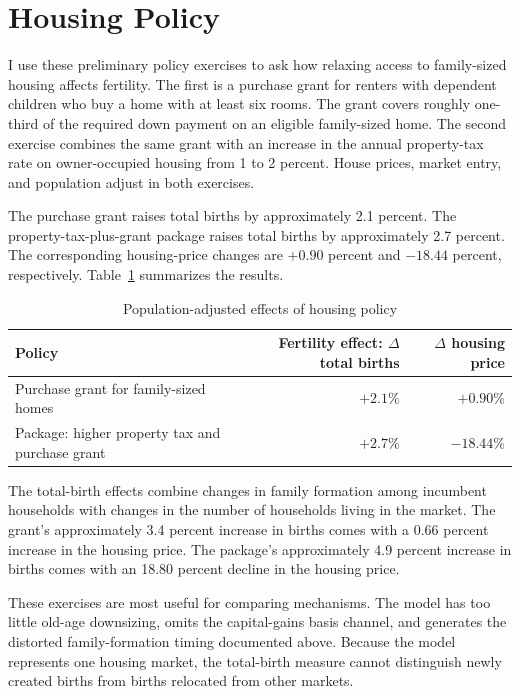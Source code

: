 \documentclass[11pt]{article}
\theoremstyle{definition}
\newcommand{\1}{\mathbf 1}
\begin{document}
\section{Housing Policy}
\label{sec:quant_policy}

I use these preliminary policy exercises to ask how relaxing access to
family-sized housing affects fertility. The first is a purchase grant for
renters with dependent children who buy a home with at least six rooms. The grant
covers roughly one-third of the required down payment on an eligible
family-sized home. The second exercise combines the same grant with an increase
in the annual property-tax rate on owner-occupied housing from 1 to 2 percent.
House prices, market entry, and population adjust in both exercises.

The purchase grant raises total births by approximately 2.1 percent. The
property-tax-plus-grant package raises total births by approximately 2.7
percent. The corresponding housing-price changes are
$+0.90$ percent and $-18.44$ percent, respectively.
Table~\ref{tab:quant_policy} summarizes the results.

\begin{table}[H]
\centering
\caption{Population-adjusted effects of housing policy}
\label{tab:quant_policy}
\small
\begin{tabularx}{0.88\textwidth}{@{}X r r@{}}
\toprule
Policy & \shortstack{Fertility effect:\\$\Delta$ total births} &
\shortstack{$\Delta$ housing\\price} \\
\midrule
Purchase grant for family-sized homes & \textbf{$+2.1\%$} & $+0.90\%$ \\
Package: higher property tax and purchase grant & \textbf{$+2.7\%$} & $-18.44\%$ \\
\bottomrule
\end{tabularx}
\end{table}

The total-birth effects combine changes in family formation among incumbent
households with changes in the number of households living in the market. The
grant's approximately 3.4 percent increase in births comes with a 0.66 percent
increase in the housing price. The package's approximately 4.9 percent increase
in births comes with an 18.80 percent decline in the housing price.

These exercises are most useful for comparing mechanisms. The model has too
little old-age downsizing, omits the capital-gains basis channel, and generates
the distorted family-formation timing documented above. Because the model
represents one housing market, the total-birth measure cannot distinguish newly
created births from births relocated from other markets.
\end{document}
